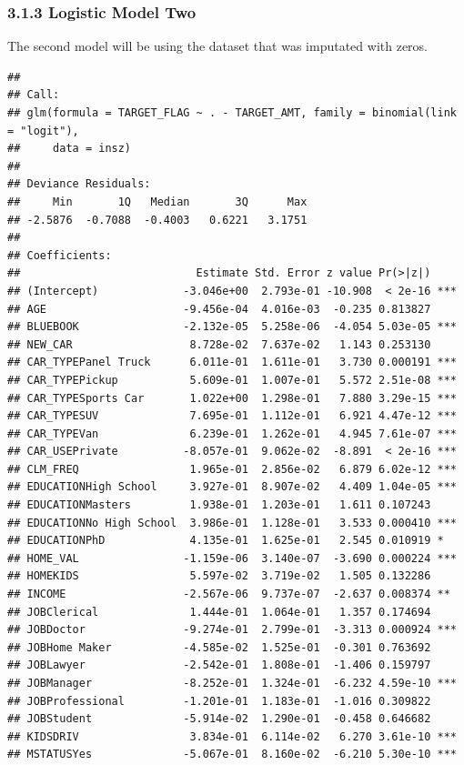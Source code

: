 \documentclass[]{article}
\begin{document}
\subsubsection{3.1.3 Logistic Model Two}\label{logistic-model-two}

The second model will be using the dataset that was imputated with
zeros.

\begin{verbatim}
## 
## Call:
## glm(formula = TARGET_FLAG ~ . - TARGET_AMT, family = binomial(link = "logit"), 
##     data = insz)
## 
## Deviance Residuals: 
##     Min       1Q   Median       3Q      Max  
## -2.5876  -0.7088  -0.4003   0.6221   3.1751  
## 
## Coefficients:
##                           Estimate Std. Error z value Pr(>|z|)    
## (Intercept)             -3.046e+00  2.793e-01 -10.908  < 2e-16 ***
## AGE                     -9.456e-04  4.016e-03  -0.235 0.813827    
## BLUEBOOK                -2.132e-05  5.258e-06  -4.054 5.03e-05 ***
## NEW_CAR                  8.728e-02  7.637e-02   1.143 0.253130    
## CAR_TYPEPanel Truck      6.011e-01  1.611e-01   3.730 0.000191 ***
## CAR_TYPEPickup           5.609e-01  1.007e-01   5.572 2.51e-08 ***
## CAR_TYPESports Car       1.022e+00  1.298e-01   7.880 3.29e-15 ***
## CAR_TYPESUV              7.695e-01  1.112e-01   6.921 4.47e-12 ***
## CAR_TYPEVan              6.239e-01  1.262e-01   4.945 7.61e-07 ***
## CAR_USEPrivate          -8.057e-01  9.062e-02  -8.891  < 2e-16 ***
## CLM_FREQ                 1.965e-01  2.856e-02   6.879 6.02e-12 ***
## EDUCATIONHigh School     3.927e-01  8.907e-02   4.409 1.04e-05 ***
## EDUCATIONMasters         1.938e-01  1.203e-01   1.611 0.107243    
## EDUCATIONNo High School  3.986e-01  1.128e-01   3.533 0.000410 ***
## EDUCATIONPhD             4.135e-01  1.625e-01   2.545 0.010919 *  
## HOME_VAL                -1.159e-06  3.140e-07  -3.690 0.000224 ***
## HOMEKIDS                 5.597e-02  3.719e-02   1.505 0.132286    
## INCOME                  -2.567e-06  9.737e-07  -2.637 0.008374 ** 
## JOBClerical              1.444e-01  1.064e-01   1.357 0.174694    
## JOBDoctor               -9.274e-01  2.799e-01  -3.313 0.000924 ***
## JOBHome Maker           -4.585e-02  1.525e-01  -0.301 0.763692    
## JOBLawyer               -2.542e-01  1.808e-01  -1.406 0.159797    
## JOBManager              -8.252e-01  1.324e-01  -6.232 4.59e-10 ***
## JOBProfessional         -1.201e-01  1.183e-01  -1.016 0.309822    
## JOBStudent              -5.914e-02  1.290e-01  -0.458 0.646682    
## KIDSDRIV                 3.834e-01  6.114e-02   6.270 3.61e-10 ***
## MSTATUSYes              -5.067e-01  8.160e-02  -6.210 5.30e-10 ***

\end{verbatim}
\end{document}

